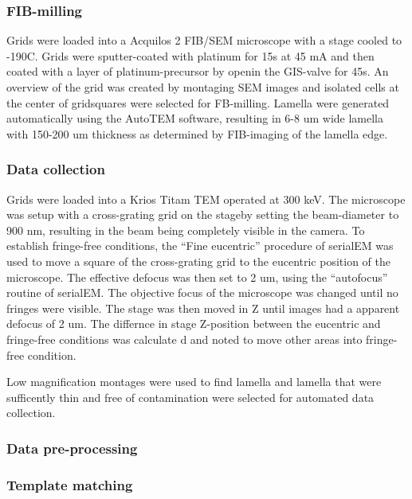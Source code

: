 \documentclass[
]{article}
\begin{document}
\hypertarget{fib-milling}{%
\subsubsection{FIB-milling}\label{fib-milling}}

Grids were loaded into a Acquilos 2 FIB/SEM microscope with a stage cooled to -190C. Grids were sputter-coated with platinum for 15s at 45 mA and then coated with a layer of platinum-precursor by openin the GIS-valve for 45s. An overview of the grid was created by montaging SEM images and isolated cells at the center of gridsquares were selected for FB-milling. Lamella were generated automatically using the AutoTEM software, resulting in 6-8 um wide lamella with 150-200 um thickness as determined by FIB-imaging of the lamella edge.

\hypertarget{data-collection}{%
\subsubsection{Data collection}\label{data-collection}}

Grids were loaded into a Krios Titam TEM operated at 300 keV. The microscope was setup with a cross-grating grid on the stageby setting the beam-diameter to 900 nm, resulting in the beam being completely visible in the camera. To establish fringe-free conditions, the ``Fine eucentric'' procedure of serialEM was used to move a square of the cross-grating grid to the eucentric position of the microscope. The effective defocus was then set to 2 um, using the ``autofocus'' routine of serialEM. The objective focus of the microscope was changed until no fringes were visible. The stage was then moved in Z until images had a apparent defocus of 2 um. The differnce in stage Z-position between the eucentric and fringe-free conditions was calculate d and noted to move other areas into fringe-free condition.

Low magnification montages were used to find lamella and lamella that were sufficently thin and free of contamination were selected for automated data collection.

\hypertarget{data-pre-processing}{%
\subsubsection{Data pre-processing}\label{data-pre-processing}}

\hypertarget{template-matching}{%
\subsubsection{Template matching}\label{template-matching}}
\end{document}
